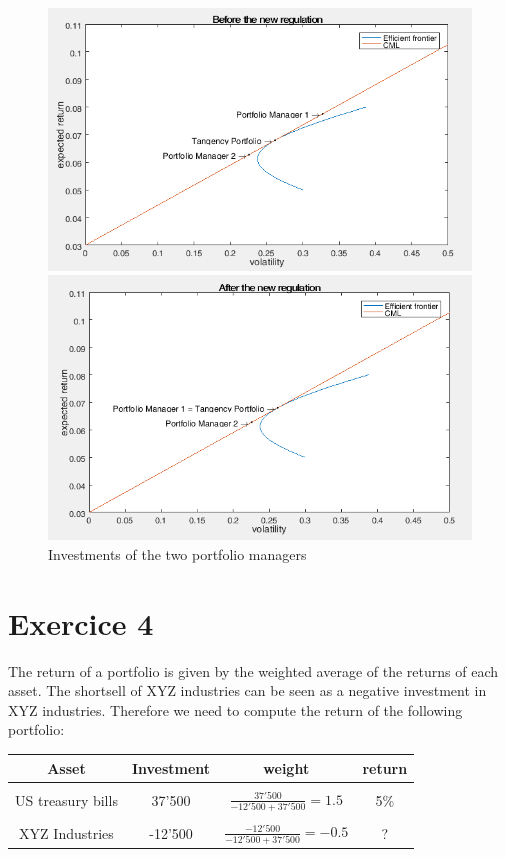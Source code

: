 \documentclass[a4paper,11pt,twoside]{article}
\begin{document}
\begin{figure}[h!]
\center
\includegraphics[width = .9 \linewidth]{Before.png}

\vspace{10pt}

\includegraphics[width = .9 \linewidth]{After.png}
\caption{Investments of the two portfolio managers}
\label{fig1}
\end{figure}

\section{Exercice 4}

The return of a portfolio is given by the weighted average of the returns of each asset. The shortsell of XYZ industries can be seen as a negative investment in XYZ industries. Therefore we need to compute the return of the following portfolio:

\begin{center} %
\begin{tabular} { c  c  c  c }
Asset & Investment & weight  & return \\[5pt]
\hline \\[-5pt]
US treasury bills & 37'500 & $ \frac{37'500}{-12'500+37'500} = 1.5 $ & 5\% \\[5pt]
\hline \\[-5pt]
XYZ Industries & -12'500 & $ \frac{-12'500}{-12'500+37'500} = -0.5 $ & ? \\[5pt]
\hline
\end{tabular}
\end{center}
\end{document}
